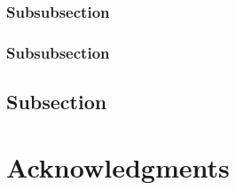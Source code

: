 \documentclass[fleqn,10pt]{wlpeerj}
\begin{document}
\lipsum[11] %

\subsubsection*{Subsubsection}

\lipsum[12] %

\subsubsection*{Subsubsection}

\lipsum[14] %

\subsection*{Subsection}

\lipsum[15-20] %

\section*{Acknowledgments}




\end{document}
